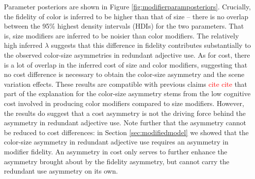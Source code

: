 \documentclass[11pt]{article}
\newcommand{\red}[1]{\textcolor{Red}{#1}}
\newcommand{\figref}[1]{Figure \ref{#1}}
\newcommand{\appref}[1]{Appendix \ref{#1}}
\newcommand{\sectionref}[1]{Section \ref{#1}}
\begin{document}
Parameter posteriors are shown in \figref{fig:modifierparamposteriors}. Crucially, the fidelity of color is inferred to be higher than that of size -- there is no overlap between the 95\% highest density intervals (HDIs) for the two parameters. %
That is, size modifiers are inferred to be noisier than color modifiers. The relatively high inferred $\lambda$ suggests that this difference in fidelity contributes substantially to the observed color-size asymmetries in redundant adjective use. As for cost, there is a lot of overlap in the inferred cost of size and color modifiers, suggesting that no cost difference is necessary to obtain the color-size asymmetry and the scene variation effects. These results are compatible with previous claims \red{cite cite} that part of the explanation for the color-size asymmetry stems from the low cognitive cost involved in producing color modifiers compared to size modifiers. However, the results do suggest that a cost asymmetry is not the driving force behind the asymmetry in redundant adjective use. Note further that the asymmetry cannot be reduced to cost differences: in \sectionref{sec:modifiedmodel} we showed that the color-size asymmetry in redundant adjective use requires an asymmetry in modifier fidelity. An asymmetry in cost only serves to further enhance the asymmetry brought about by the fidelity asymmetry, but cannot carry the redundant use asymmetry on its own.
\end{document}
